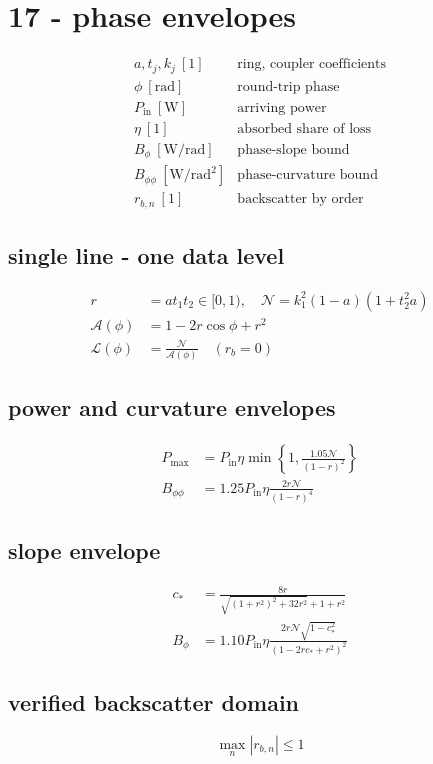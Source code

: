 \section*{17 - phase envelopes}

\[
\begin{array}{ll}a,t_j,k_j\ [1]&\text{ring, coupler coefficients}\\[0.6em]\phi\ [\mathrm{rad}]&\text{round-trip phase}\\[0.6em]P_{\mathrm{in}}\ [\mathrm W]&\text{arriving power}\\[0.6em]\eta\ [1]&\text{absorbed share of loss}\\[0.6em]B_\phi\ [\mathrm{W/rad}]&\text{phase-slope bound}\\[0.6em]B_{\phi\phi}\ [\mathrm{W/rad^2}]&\text{phase-curvature bound}\\[0.6em]r_{b,n}\ [1]&\text{backscatter by order}\end{array}
\]

\subsection*{single line - one data level}
\[
\displaystyle \begin{aligned}r&=at_1t_2\in[0,1),\quad\mathcal N=k_1^2(1-a)(1+t_2^2a)\\\mathcal A(\phi)&=1-2r\cos\phi+r^2\\\mathcal L(\phi)&=\frac{\mathcal N}{\mathcal A(\phi)}\quad(r_b=0)\end{aligned}
\]

\subsection*{power and curvature envelopes}
\[
\displaystyle \begin{aligned}P_{\max}&=P_{\mathrm{in}}\eta\min\!\left\{1,\frac{1.05\mathcal N}{(1-r)^2}\right\}\\B_{\phi\phi}&=1.25P_{\mathrm{in}}\eta\frac{2r\mathcal N}{(1-r)^4}\end{aligned}
\]

\subsection*{slope envelope}
\[
\displaystyle \begin{aligned}c_*&=\frac{8r}{\sqrt{(1+r^2)^2+32r^2}+1+r^2}\\B_\phi&=1.10P_{\mathrm{in}}\eta\frac{2r\mathcal N\sqrt{1-c_*^2}}{(1-2rc_*+r^2)^2}\end{aligned}
\]

\subsection*{verified backscatter domain}
\[
\displaystyle \max_n|r_{b,n}|\le1
\]
